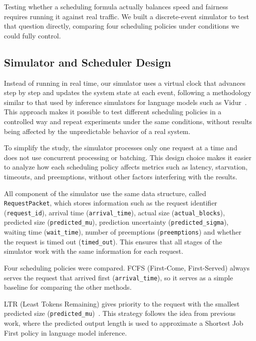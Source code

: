 Testing whether a scheduling formula actually balances speed and fairness requires running it against real traffic. We built a discrete-event simulator to test that question directly, comparing four scheduling policies under conditions we could fully control.

\subsection{Simulator and Scheduler Design}

Instead of running in real time, our simulator uses a virtual clock that advances step by step and updates the system state at each event, following a methodology similar to that used by inference simulators for language models such as Vidur~\cite{agrawal2024vidur}. This approach makes it possible to test different scheduling policies in a controlled way and repeat experiments under the same conditions, without results being affected by the unpredictable behavior of a real system.

To simplify the study, the simulator processes only one request at a time and does not use concurrent processing or batching. This design choice makes it easier to analyze how each scheduling policy affects metrics such as latency, starvation, timeouts, and preemptions, without other factors interfering with the results.

All component of the simulator use the same data structure, called \texttt{RequestPacket}, which stores information such as the request identifier (\texttt{request\_id}), arrival time (\texttt{arrival\_time}), actual size (\texttt{actual\_blocks}), predicted size (\texttt{predicted\_mu}), prediction uncertainty (\texttt{predicted\_sigma}), waiting time (\texttt{wait\_time}), number of preemptions (\texttt{preemptions}) and whether the request is timed out (\texttt{timed\_out}). This ensures that all stages of the simulator work with the same information for each request.

Four scheduling policies were compared. FCFS (First-Come, First-Served) always serves the request that arrived first (\texttt{arrival\_time}), so it serves as a simple baseline for comparing the other methods.

LTR (Least Tokens Remaining) gives priority to the request with the smallest predicted size (\texttt{predicted\_mu})~\cite{fu2024ltr}. This strategy follows the idea from previous work, where the predicted output length is used to approximate a Shortest Job First policy in language model inference.


